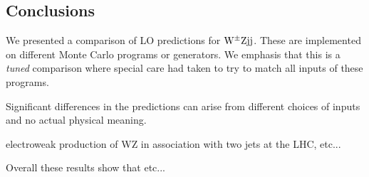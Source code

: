 \documentclass[11pt]{cernrep}
\begin{document}
\subsection{Conclusions \label{concl}}

We presented a comparison of LO predictions for ${\rm W}^{\pm}{\rm Z}{\rm j}{\rm j}$.
These are implemented on different Monte Carlo programs or generators.
We emphasis that this is a \emph{tuned} comparison where special care had taken to try to match all inputs of these programs.

Significant differences in the predictions can arise from different choices of inputs and no actual physical meaning.

electroweak production of WZ in association with two jets at the LHC, etc... 

Overall these results show that etc...


\end{document}
